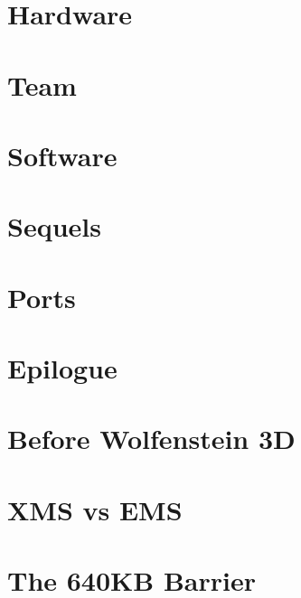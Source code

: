 \documentclass[8pt]{book}
\begin{document}
    \chapter{Hardware}
      

  
    \chapter{Team}
      
      
    \chapter{Software}
       
       
      
       
       
      
       
    
  
           


\chapter{Sequels}
        
        

    \chapter{Ports}        
        
        
    
       \chapter{Epilogue}
        

        \appendix
    \appendixpage

\chapter{Before Wolfenstein 3D}
        
    
    \chapter{XMS vs EMS} 
          
    \chapter{The 640KB Barrier}\label{chap:barrier640}
        
\end{document}
